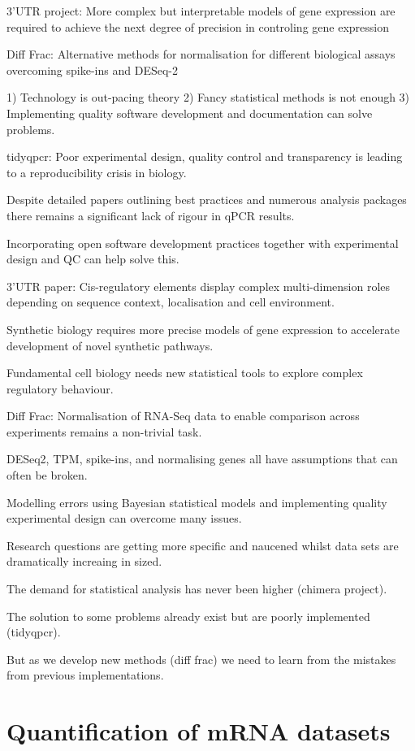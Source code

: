 \documentclass{SBCbookchapter}
\begin{document}
3'UTR project: More complex but interpretable models of gene expression are required to achieve the next degree of precision in controling gene expression

Diff Frac: Alternative methods for normalisation for different biological assays overcoming spike-ins and DESeq-2

1) Technology is out-pacing theory
2) Fancy statistical methods is not enough
3) Implementing quality software development and documentation can solve problems.

tidyqpcr: Poor experimental design, quality control and transparency is leading to a reproducibility crisis in biology.

Despite detailed papers outlining best practices and numerous analysis packages there remains a significant lack of rigour in qPCR results.

Incorporating open software development practices together with experimental design and QC can help solve this.

3’UTR paper: Cis-regulatory elements display complex multi-dimension roles depending on sequence context, localisation and cell environment.

Synthetic biology requires more precise models of gene expression to accelerate development of novel synthetic pathways.

Fundamental cell biology needs new statistical tools to explore complex regulatory behaviour.

Diff Frac: Normalisation of RNA-Seq data to enable comparison across experiments remains a non-trivial task. 

DESeq2, TPM, spike-ins, and normalising genes all have assumptions that can often be broken.

Modelling errors using Bayesian statistical models and implementing quality experimental design can overcome many issues.

Research questions are getting more specific and naucened whilst data sets are dramatically increaing in sized. 

The demand for statistical analysis has never been higher (chimera project).

The solution to some problems already exist but are poorly implemented (tidyqpcr).

But as we develop new methods (diff frac) we need to learn from the mistakes from previous implementations.

\section{Quantification of mRNA datasets}
\end{document}
